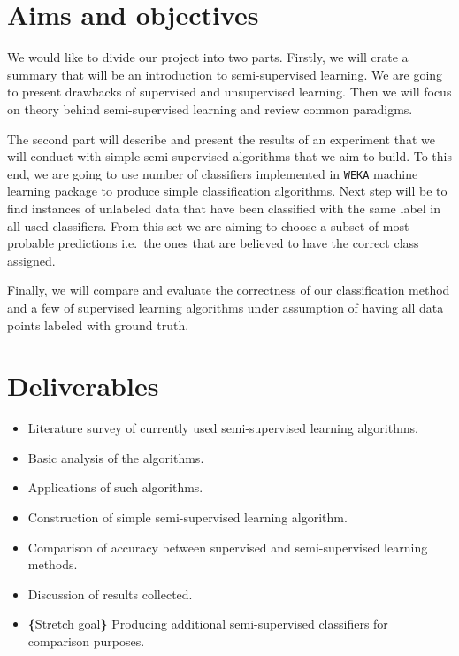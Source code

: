 \documentclass[12pt,a4paper,twocolumn]{article}
\begin{document}
\section*{Aims and objectives}
We would like to divide our project into two parts. Firstly, we will crate a summary that will be an introduction to semi-supervised learning. We are going to present drawbacks of supervised and unsupervised learning. Then we will focus on theory behind semi-supervised learning and review common paradigms.

The second part will describe and present the results of an experiment that we will conduct with simple semi-supervised algorithms that we aim to build. To this end, we are going to use number of classifiers implemented in \texttt{WEKA} machine learning package to produce simple classification algorithms. Next step will be to find instances of unlabeled data that have been classified with the same label in all used classifiers. From this set we are aiming to choose a subset of most probable predictions i.e.\ the ones that are believed to have the correct class assigned.

Finally, we will compare and evaluate the correctness of our classification method and a few of supervised learning algorithms under assumption of having all data points labeled with ground truth.



\section*{Deliverables}
\begin{itemize}
\item Literature survey of currently used semi-supervised learning algorithms.
\item Basic analysis of the algorithms.
\item Applications of such algorithms.
\vspace{30pt}
\item Construction of simple semi-supervised learning algorithm.
\item Comparison of accuracy between supervised and semi-supervised learning methods.
\item Discussion of results collected.
\item \textbf{\{}Stretch goal\textbf{\}} Producing additional semi-supervised classifiers for comparison purposes.\
\end{itemize}
\end{document}
